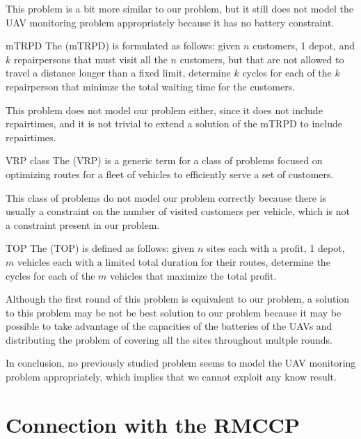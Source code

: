 \documentclass[a4paper, 12pt]{report}
\begin{document}
    This problem is a bit more similar to our problem, but it still does not model the UAV monitoring problem appropriately because it has no battery constraint.

    \begin{frameddefn}{mTRPD}
        The  (mTRPD) is formulated as follows: given $n$ customers, 1 depot, and $k$ repairpersons that must visit all the $n$ customers, but that are not allowed to travel a distance longer than a fixed limit, determine $k$ cycles for each of the $k$ repairperson that minimze the total waiting time for the customers.
    \end{frameddefn}

    This problem does not model our problem either, since it does not include repairtimes, and it is not trivial to extend a solution of the mTRPD to include repairtimes.

    \begin{frameddefn}{VRP class}
        The  (VRP) is a generic term for a class of problems focused on optimizing routes for a fleet of vehicles to efficiently serve a set of customers.
    \end{frameddefn}

    This class of problems do not model our problem correctly because there is usually a constraint on the number of visited customers per vehicle, which is not a constraint present in our problem.

    \begin{frameddefn}{TOP}
        The  (TOP) is defined as follows: given $n$ sites each with a profit, 1 depot, $m$ vehicles each with a limited total duration for their routes, determine the cycles for each of the $m$ vehicles that maximize the total profit.
    \end{frameddefn}

    Although the first round of this problem is equivalent to our problem, a solution to this problem may be not be best solution to our problem because it may be possible to take advantage of the capacities of the batteries of the UAVs and distributing the problem of covering all the sites throughout multple rounds.

    In conclusion, no previously studied problem seems to model the UAV monitoring problem appropriately, which implies that we cannot exploit any know result.

    \section{Connection with the RMCCP}
    
\end{document}

